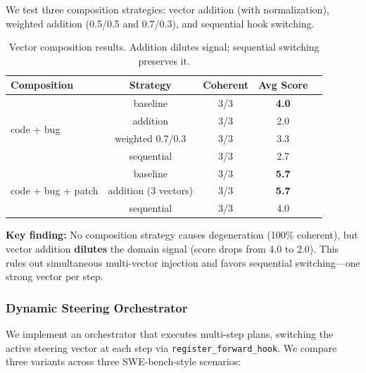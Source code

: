 \documentclass[11pt,a4paper]{article}
\begin{document}
We test three composition strategies: vector addition (with normalization), weighted addition (0.5/0.5 and 0.7/0.3), and sequential hook switching.

\begin{table}[H]
\centering
\caption{Vector composition results. Addition dilutes signal; sequential switching preserves it.}
\label{tab:composition}
\small
\begin{tabular}{lcccc}
\toprule
\textbf{Composition} & \textbf{Strategy} & \textbf{Coherent} & \textbf{Avg Score} \\
\midrule
\multirow{4}{*}{code + bug} & baseline & 3/3 & \textbf{4.0} \\
& addition & 3/3 & 2.0 \\
& weighted 0.7/0.3 & 3/3 & 3.3 \\
& sequential & 3/3 & 2.7 \\
\midrule
\multirow{3}{*}{code + bug + patch} & baseline & 3/3 & \textbf{5.7} \\
& addition (3 vectors) & 3/3 & \textbf{5.7} \\
& sequential & 3/3 & 4.0 \\
\bottomrule
\end{tabular}
\end{table}

\textbf{Key finding:} No composition strategy causes degeneration (100\% coherent), but vector addition \textbf{dilutes} the domain signal (score drops from 4.0 to 2.0). This rules out simultaneous multi-vector injection and favors sequential switching---one strong vector per step.

\subsubsection{Dynamic Steering Orchestrator}

We implement an orchestrator that executes multi-step plans, switching the active steering vector at each step via \texttt{register\_forward\_hook}. We compare three variants across three SWE-bench-style scenarios:
\end{document}
